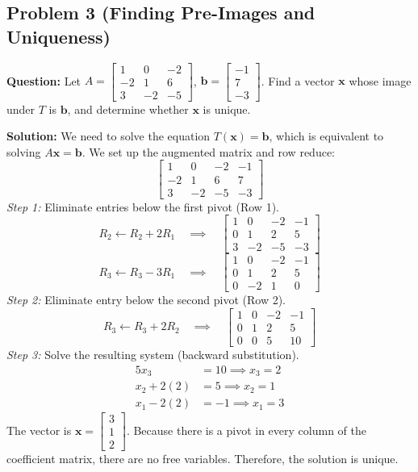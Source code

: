 \documentclass[11pt]{article}
\begin{document}
\subsection{Problem 3 (Finding Pre-Images and Uniqueness)}
\textbf{Question:} Let $A = \begin{bmatrix} 1 & 0 & -2 \\ -2 & 1 & 6 \\ 3 & -2 & -5 \end{bmatrix}$, $\mathbf{b} = \begin{bmatrix} -1 \\ 7 \\ -3 \end{bmatrix}$. Find a vector $\mathbf{x}$ whose image under $T$ is $\mathbf{b}$, and determine whether $\mathbf{x}$ is unique.

\textbf{Solution:}
We need to solve the equation $T(\mathbf{x}) = \mathbf{b}$, which is equivalent to solving $A\mathbf{x} = \mathbf{b}$. We set up the augmented matrix and row reduce:
\[ \left[ \begin{array}{ccc|c} 1 & 0 & -2 & -1 \\ -2 & 1 & 6 & 7 \\ 3 & -2 & -5 & -3 \end{array} \right] \]
\textit{Step 1:} Eliminate entries below the first pivot (Row 1).
\[ R_2 \leftarrow R_2 + 2R_1 \quad \implies \quad \left[ \begin{array}{ccc|c} 1 & 0 & -2 & -1 \\ 0 & 1 & 2 & 5 \\ 3 & -2 & -5 & -3 \end{array} \right] \]
\[ R_3 \leftarrow R_3 - 3R_1 \quad \implies \quad \left[ \begin{array}{ccc|c} 1 & 0 & -2 & -1 \\ 0 & 1 & 2 & 5 \\ 0 & -2 & 1 & 0 \end{array} \right] \]
\textit{Step 2:} Eliminate entry below the second pivot (Row 2).
\[ R_3 \leftarrow R_3 + 2R_2 \quad \implies \quad \left[ \begin{array}{ccc|c} 1 & 0 & -2 & -1 \\ 0 & 1 & 2 & 5 \\ 0 & 0 & 5 & 10 \end{array} \right] \]
\textit{Step 3:} Solve the resulting system (backward substitution).
\begin{align*}
    5x_3 &= 10 \implies x_3 = 2 \\
    x_2 + 2(2) &= 5 \implies x_2 = 1 \\
    x_1 - 2(2) &= -1 \implies x_1 = 3
\end{align*}
The vector is $\mathbf{x} = \begin{bmatrix} 3 \\ 1 \\ 2 \end{bmatrix}$. 
Because there is a pivot in every column of the coefficient matrix, there are no free variables. Therefore, the solution is unique.
\end{document}
